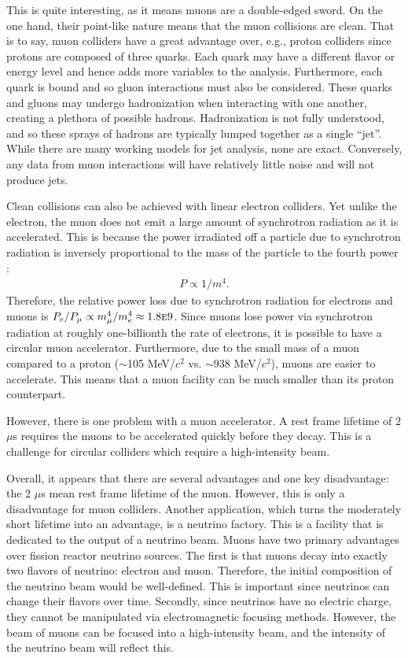 This is quite interesting, as it means muons are a double-edged sword. On the one hand, their point-like nature means that the muon collisions are clean. That is to say, muon colliders have a great advantage over, e.g., proton colliders since protons are composed of three quarks. Each quark may have a different flavor or energy level and hence adds more variables to the analysis. Furthermore, each quark is bound and so gluon interactions must also be considered. These quarks and gluons may undergo hadronization when interacting with one another, creating a plethora of possible hadrons. Hadronization is not fully understood, and so these sprays of hadrons are typically lumped together as a single ``jet''. While there are many working models for jet analysis, none are exact. Conversely, any data from muon interactions will have relatively little noise and will not produce jets.

Clean collisions can also be achieved with linear electron colliders. Yet unlike the electron, the muon does not emit a large amount of synchrotron radiation as it is accelerated. This is because the power irradiated off a particle due to synchrotron radiation is inversely proportional to the mass of the particle to the fourth power \cite{griffithsem}:
\begin{align*}
P \propto 1/m^4.
\end{align*}
Therefore, the relative power loss due to synchrotron radiation for electrons and muons is $P_e/P_\mu\propto m_\mu ^4/m_e ^4 \approx 1.8 \text{\sc{e}}9$. Since muons lose power via synchrotron radiation at roughly one-billionth the rate of electrons, it is possible to have a circular muon accelerator. Furthermore, due to the small mass of a muon compared to a proton ($\sim$105 MeV/$c^2$ vs. $\sim$938 MeV/$c^2$), muons are easier to accelerate. This means that a muon facility can be much smaller than its proton counterpart. 

However, there is one problem with a muon accelerator. A rest frame lifetime of 2 $\mu$s requires the muons to be accelerated quickly before they decay. This is a challenge for circular colliders which require a high-intensity beam.

Overall, it appears that there are several advantages and one key disadvantage: the 2 $\mu$s mean rest frame lifetime of the muon. However, this is only a disadvantage for muon colliders. Another application, which turns the moderately short lifetime into an advantage, is a neutrino factory. This is a facility that is dedicated to the output of a neutrino beam. Muons have two primary advantages over fission reactor neutrino sources. The first is that muons decay into exactly two flavors of neutrino: electron and muon. Therefore, the initial composition of the neutrino beam would be well-defined. This is important since neutrinos can change their flavors over time. Secondly, since neutrinos have no electric charge, they cannot be manipulated via electromagnetic focusing methods. However, the beam of muons can be focused into a high-intensity beam, and the intensity of the neutrino beam will reflect this.

